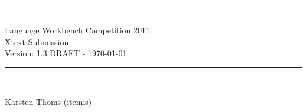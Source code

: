 \begin{titlepage}

\begin{center}

\\[3cm]


\rule{\linewidth}{0.7mm}
\\[0.4cm]


    \selectfont
    \LARGE{\color{darkblue}Language Workbench Competition 2011 \\
    Xtext Submission} \\[0.5cm]

    \color{black}
    \large{Version: 1.3 DRAFT - \today}
    \\[0.4cm]
\rule{\linewidth}{0.7mm}
\\[1.5cm]
\normalfont

\selectfont
Karsten Thoms (itemis)
\normalfont

\vfill


\end{center}

\end{titlepage}